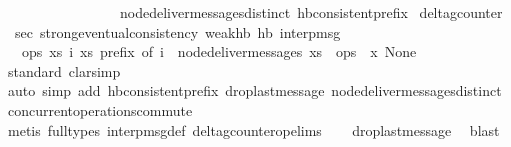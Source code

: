 \begin{isabellebody}
\ \ \ \ \ \ \ \ \ \ \ \ \ \ \ \ node{\isacharunderscore}deliver{\isacharunderscore}messages{\isacharunderscore}distinct\ hb{\isacharunderscore}consistent{\isacharunderscore}prefix{\isacharparenright}%
\endisatagproof
{\isafoldproof}%
%
\isadelimproof
\isanewline
%
\endisadelimproof
\isanewline
{}\isamarkupfalse%
\ delta{\isacharunderscore}gcounter\ \isanewline
\isanewline
{}\isamarkupfalse%
\ sec{\isacharcolon}\ strong{\isacharunderscore}eventual{\isacharunderscore}consistency\ weak{\isacharunderscore}hb\ hb\ interp{\isacharunderscore}msg\isanewline
\ \ {\isachardoublequoteopen}{\isasymlambda}ops{\isachardot}\ {\isasymexists}xs\ i{\isachardot}\ xs\ prefix\ of\ i\ {\isasymand}\ node{\isacharunderscore}deliver{\isacharunderscore}messages\ xs\ {\isacharequal}\ ops{\isachardoublequoteclose}\ {\isachardoublequoteopen}{\isasymlambda}\ x{\isachardot}\ None{\isachardoublequoteclose}\isanewline
%
\isadelimproof
\ \ %
\endisadelimproof
%
\isatagproof
{}\isamarkupfalse%
{\isacharparenleft}standard{\isacharsemicolon}\ clarsimp{\isacharparenright}\isanewline
\ \ \ \ \ \ \isamarkupfalse%
{\isacharparenleft}auto\ simp\ add{\isacharcolon}\ hb{\isacharunderscore}consistent{\isacharunderscore}prefix\ drop{\isacharunderscore}last{\isacharunderscore}message\ node{\isacharunderscore}deliver{\isacharunderscore}messages{\isacharunderscore}distinct\ concurrent{\isacharunderscore}operations{\isacharunderscore}commute{\isacharparenright}\isanewline
\ \ \ \isamarkupfalse%
{\isacharparenleft}metis\ {\isacharparenleft}full{\isacharunderscore}types{\isacharparenright}\ interp{\isacharunderscore}msg{\isacharunderscore}def\ delta{\isacharunderscore}gcounter{\isacharunderscore}op{\isachardot}elims{\isacharparenright}\isanewline
\ \ \isamarkupfalse%
\ drop{\isacharunderscore}last{\isacharunderscore}message\ \isamarkupfalse%
\ blast\isanewline
\ \ \isamarkupfalse%
%
\endisatagproof
{\isafoldproof}%
%
\isadelimproof
\isanewline
%
\endisadelimproof
{}\isamarkupfalse%
\isanewline
%
\isadelimtheory
\isanewline
%
\endisadelimtheory
%
\isatagtheory
{}\isamarkupfalse%
%
\endisatagtheory
{\isafoldtheory}%
%
\isadelimtheory
%
\endisadelimtheory
%
\end{isabellebody}%
\endinput
